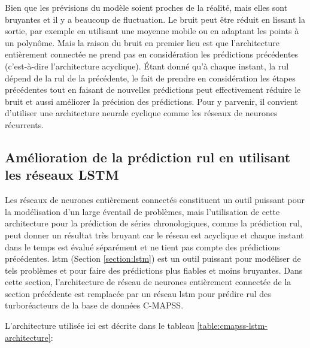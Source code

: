 Bien que les prévisions du modèle soient proches de la réalité, mais elles sont bruyantes et il y a beaucoup de fluctuation. Le bruit peut être réduit en lissant la sortie, par exemple en utilisant une moyenne mobile ou en adaptant les points à un polynôme. Mais la raison du bruit en premier lieu est que l'architecture entièrement connectée ne prend pas en considération les prédictions précédentes (c'est-à-dire l'architecture acyclique). Étant donné qu'à chaque instant, la \acrshort{rul} dépend de la \acrshort{rul} de la précédente, le fait de prendre en considération les étapes précédentes tout en faisant de nouvelles prédictions peut effectivement réduire le bruit et aussi améliorer la précision des prédictions. Pour y parvenir, il convient d'utiliser une architecture neurale cyclique comme les réseaux de neurones récurrents.

\subsection{Amélioration de la prédiction \acrshort{rul} en utilisant les réseaux LSTM}

Les réseaux de neurones entièrement connectés constituent un outil puissant pour la modélisation d'un large éventail de problèmes, mais l'utilisation de cette architecture pour la prédiction de séries chronologiques, comme la prédiction \acrshort{rul}, peut donner un résultat très bruyant car le réseau est acyclique et chaque instant dans le temps est évalué séparément et ne tient pas compte des prédictions précédentes. \acrlong{lstm} (Section \ref{section:lstm}) est un outil puissant pour modéliser de tels problèmes et pour faire des prédictions plus fiables et moins bruyantes. Dans cette section, l'architecture de réseau de neurones entièrement connectée de la section précédente est remplacée par un réseau \acrshort{lstm} pour prédire \acrshort{rul} des turboréacteurs de la base de données C-MAPSS.

L'architecture utilisée ici est décrite dans le tableau \ref{table:cmapss-lstm-architecture}:

